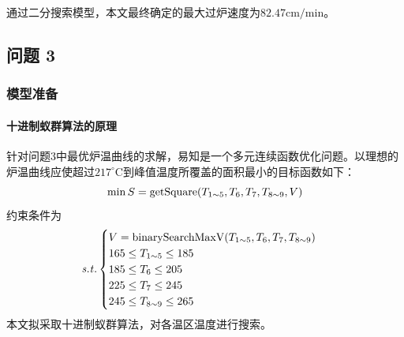 \documentclass[../main.tex]{subfiles}
\begin{document}
% 
% 
% 
% 
% 
通过二分搜索模型，本文最终确定的最大过炉速度为\(82.47 \mathrm{cm}/\mathrm{min}\)。

\subsection{问题 3}
\subsubsection{模型准备}
\paragraph{十进制蚁群算法的原理}
针对问题3中最优炉温曲线的求解，易知是一个多元连续函数优化问题。以理想的炉温曲线应使超过\(217 ^{\circ}\mathrm{C}\)到峰值温度所覆盖的面积最小的目标函数如下：
\begin{equation}
\min S = \mathrm{getSquare} (T _{1 {\sim} 5},T _{6} , T _{7} , T _{8 {\sim} 9}, V) \\
\end{equation}
约束条件为
\begin{equation}{\it s.t.}
\begin{cases}
V = \mathrm{binarySearchMaxV} (T _{1{\sim} 5}, T_{6} , T _{7},T_{8{\sim} 9})\\
165 \le T_{1 {\sim} 5} \le 185\\
185 \le T _{6} \le 205 \\
225 \le T _{7} \le 245 \\
245 \le T _{8 {\sim} 9} \le 265
\end{cases}
\end{equation}
本文拟采取十进制蚁群算法，对各温区温度进行搜索。
\end{document}
